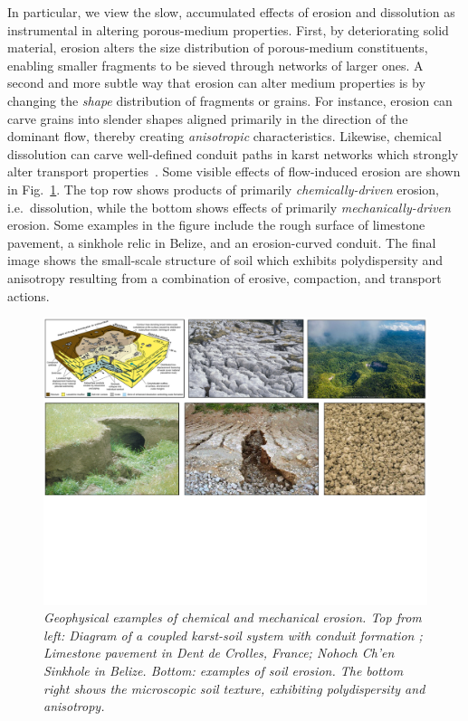 \documentclass[11pt]{article}
\begin{document}
In particular, we view the slow, accumulated effects of erosion and dissolution as instrumental in altering porous-medium properties. First, by deteriorating solid material, erosion alters the size distribution of porous-medium constituents, enabling smaller fragments to be sieved through networks of larger ones. A second and more subtle way that erosion can alter medium properties is by changing the {\em shape} distribution of fragments or grains. For instance, erosion can carve grains  into slender shapes aligned primarily in the direction of the dominant flow, thereby creating {\em anisotropic} characteristics. Likewise, chemical dissolution can carve well-defined conduit paths in karst networks which strongly alter transport properties~\cite{szymczak2009wormhole}. Some visible effects of flow-induced erosion are shown in Fig.~\ref{collage}. The top row shows products of primarily {\em chemically-driven} erosion, i.e.~dissolution, while the bottom shows effects of primarily {\em mechanically-driven} erosion. Some examples in the figure include the rough surface of limestone pavement, a sinkhole relic in Belize, and an erosion-curved conduit. The final image shows the small-scale structure of soil which exhibits polydispersity and anisotropy resulting from a combination of erosive, compaction, and transport actions.

\begin{figure}%
\begin{center}
\includegraphics[width = 0.99 \textwidth]{./figs/collage.pdf}
\caption{\label{collage} \em Geophysical examples of chemical and mechanical erosion. Top from left: Diagram of a coupled karst-soil system with conduit formation \cite{watson2019sinkholes}; Limestone pavement in Dent de Crolles, France; Nohoch Ch’en Sinkhole in Belize. Bottom: examples of soil erosion. The bottom right shows the microscopic soil texture, exhibiting polydispersity and anisotropy.}
\end{center}
\end{figure}
\end{document}
